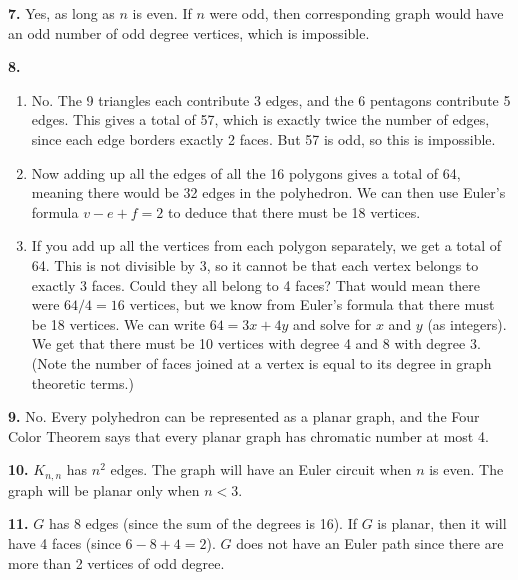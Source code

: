 \documentclass[10pt,]{book}
\theoremstyle{plain}
\theoremstyle{definition}
\theoremstyle{definition}
\theoremstyle{definition}
\numberwithin{equation}{chapter}
\newcommand{\lt}{ < }
\begin{document}
\par\smallskip
\noindent\textbf{7.}\quad{}
            Yes, as long as \(n\) is even. If \(n\) were odd, then corresponding graph would have an odd number of odd degree vertices, which is impossible.
\par\smallskip
\noindent\textbf{8.}\quad{}\leavevmode%
\begin{enumerate}[label=(\alph*)]
\item\hypertarget{li-1256}{}
                No. The 9 triangles each contribute 3 edges, and the 6 pentagons contribute 5 edges. This gives a total of 57, which is exactly twice the number of edges, since each edge borders exactly 2 faces. But 57 is odd, so this is impossible.
\item\hypertarget{li-1257}{}
                Now adding up all the edges of all the 16 polygons gives a total of 64, meaning there would be 32 edges in the polyhedron. We can then use Euler's formula \(v - e + f = 2\) to deduce that there must be 18 vertices.
\item\hypertarget{li-1258}{}
                If you add up all the vertices from each polygon separately, we get a total of 64. This is not divisible by 3, so it cannot be that each vertex belongs to exactly 3 faces. Could they all belong to 4 faces? That would mean there were \(64/4 = 16\) vertices, but we know from Euler's formula that there must be 18 vertices. We can write \(64 = 3x + 4y\) and solve for \(x\) and \(y\) (as integers). We get that there must be 10 vertices with degree 4 and 8 with degree 3. (Note the number of faces joined at a vertex is equal to its degree in graph theoretic terms.)
\end{enumerate}
\par\smallskip
\noindent\textbf{9.}\quad{}
            No. Every polyhedron can be represented as a planar graph, and the Four Color Theorem says that every planar graph has chromatic number at most 4.
\par\smallskip
\noindent\textbf{10.}\quad{}
            \(K_{n,n}\) has \(n^2\) edges. The graph will have an Euler circuit when \(n\) is even. The graph will be planar only when \(n \lt  3\).
\par\smallskip
\noindent\textbf{11.}\quad{}
            \(G\) has 8 edges (since the sum of the degrees is 16). If \(G\) is planar, then it will have 4 faces (since \(6 - 8 + 4 = 2\)). \(G\) does not have an Euler path since there are more than 2 vertices of odd degree.
\end{document}
